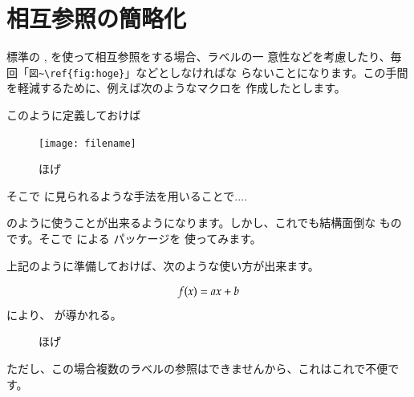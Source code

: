 

\section{相互参照の簡略化\texorpdfstring{\zdash}{---}}

\LaTeXe 標準の ,  を使って相互参照をする場合、ラベルの一
意性などを考慮したり、毎回「\verb|図~\ref{fig:hoge}|」などとしなければな
らないことになります。この手間を軽減するために、例えば次のようなマクロを
作成したとします。
\begin{inputex}
\newcommand*\figlab[1]{\label{fig:#1}}
\newcommand*\figref[1]{図~\ref{fig:#1}} 
\end{inputex}
このように定義しておけば
\begin{inputex}
\begin{figure}[htbp]
  \centering
  \texttt{[image: filename]}
  \caption{ほげ}
\end{figure}  
そこで  に見られるような手法を用いることで....
\end{inputex}
のように使うことが出来るようになります。しかし、これでも結構面倒な
ものです。そこで による  パッケージを
使ってみます。
\begin{inputex}
\usepackage{prettyref}
\newcommand*\figlab[1]{\label{fig:#1}}
\newcommand*\tablab[1]{\label{tab:#1}}
\newcommand*\chaplab[1]{\label{chap:#1}}
\newcommand*\seclab[1]{\label{sec:#1}}
\newcommand*\equlab[1]{\label{equ:#1}}
%
\end{inputex}
上記のように準備しておけば、次のような使い方が出来ます。
\begin{inputex}
\begin{equation}\equlab{hoge}
 f(x) = ax + b
\end{equation}
 により、 が導かれる。
\begin{figure}[htbp]
\caption{ほげ} 
\end{figure} 
\end{inputex}
ただし、この場合複数のラベルの参照はできませんから、これはこれで不便です。




